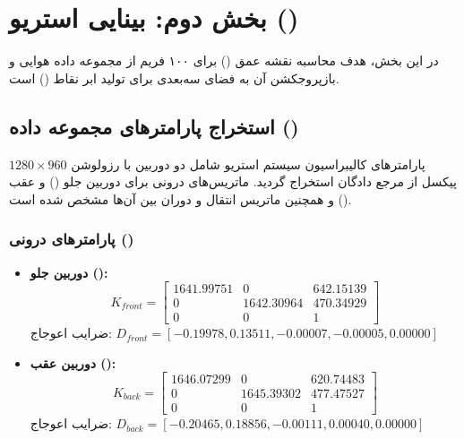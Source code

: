 \documentclass[12pt,a4paper]{article}
\begin{document}
\newpage

\section{بخش دوم: بینایی استریو ()}
در این بخش، هدف محاسبه نقشه عمق () برای ۱۰۰ فریم از مجموعه داده هوایی  و بازپروجکشن آن به فضای سه‌بعدی برای تولید ابر نقاط () است.

\subsection{استخراج پارامترهای مجموعه داده ()}
پارامترهای کالیبراسیون سیستم استریو شامل دو دوربین با رزولوشن $1280\times960$ پیکسل از مرجع دادگان استخراج گردید. ماتریس‌های درونی برای دوربین جلو () و عقب () و همچنین ماتریس انتقال و دوران بین آن‌ها مشخص شده است.

\subsubsection*{پارامترهای درونی ()}
\begin{itemize}
	\item \textbf{دوربین جلو ():}
	\begin{equation}
		K_{front} = \begin{bmatrix} 1641.99751 & 0 & 642.15139 \\ 0 & 1642.30964 & 470.34929 \\ 0 & 0 & 1 \end{bmatrix}
	\end{equation}
	ضرایب اعوجاج: $D_{front} = [-0.19978, 0.13511, -0.00007, -0.00005, 0.00000]$
	
	\item \textbf{دوربین عقب ():}
	\begin{equation}
		K_{back} = \begin{bmatrix} 1646.07299 & 0 & 620.74483 \\ 0 & 1645.39302 & 477.47527 \\ 0 & 0 & 1 \end{bmatrix}
	\end{equation}
	ضرایب اعوجاج: $D_{back} = [-0.20465, 0.18856, -0.00111, 0.00040, 0.00000]$
\end{itemize}
\end{document}
